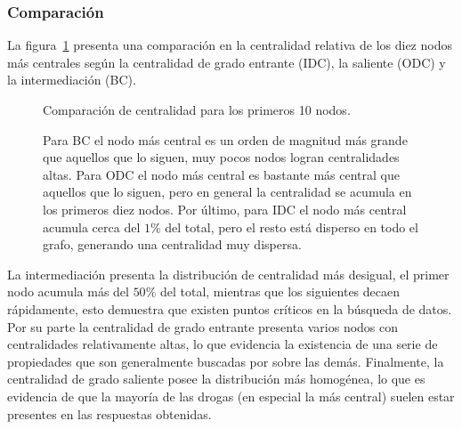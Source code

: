 \subsubsection{Comparación}
La figura~\ref{fig:compcent} presenta una comparación en la centralidad relativa
de los diez nodos más centrales según la centralidad de grado entrante (IDC), la
saliente (ODC) y la intermediación (BC).
\begin{figure}[h]
  \caption{Comparación de centralidad para los primeros 10 nodos.}
  \vspace{-.2cm}
  \caption*{\small
    Para BC el nodo más central es un orden de magnitud más grande que aquellos
    que lo siguen, muy pocos nodos logran centralidades altas.
    Para ODC el nodo más central es bastante más central que aquellos que lo
    siguen, pero en general la centralidad se acumula en los primeros diez
    nodos.
    Por último, para IDC el nodo más central acumula cerca del $1\%$ del total,
    pero el resto está disperso en todo el grafo, generando una centralidad muy
    dispersa.
  }
  \label{fig:compcent}
\end{figure}

La intermediación presenta la distribución de centralidad más desigual, el
primer nodo acumula más del $50\%$ del total, mientras que los siguientes decaen
rápidamente, esto demuestra que existen puntos críticos en la búsqueda de datos.
Por su parte la centralidad de grado entrante presenta varios nodos con
centralidades relativamente altas, lo que evidencia la existencia de una serie
de propiedades que son generalmente buscadas por sobre las demás.
Finalmente, la centralidad de grado saliente posee la distribución más
homogénea, lo que es evidencia de que la mayoría de las drogas (en especial la
más central) suelen estar presentes en las respuestas obtenidas.

